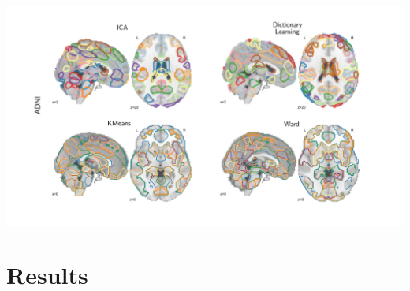 \documentclass[portrait,a0,final]{a0poster} %
\begin{document}
\begin{minipage}{0.98\linewidth}
\begin{minipage}[t]{0.48\linewidth}
\begin{minipage}{0.22\textwidth}
\begin{minipage}{1.5\linewidth}
\begin{center}
\includegraphics[width=2.22\linewidth]{figures/rois2.pdf}
\end{center}
\end{minipage}
\end{minipage}
%

\end{minipage} %
\hspace{0.02\linewidth} %
\begin{minipage}[t]{0.48\linewidth}
\setlength{\parindent}{10mm} %










\section{Results}

\end{minipage}
\end{minipage}
\end{document}

